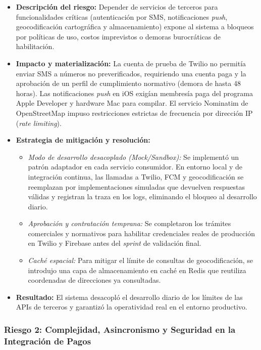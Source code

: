 \begin{itemize}
    \item \textbf{Descripción del riesgo:} Depender de servicios de terceros para funcionalidades críticas (autenticación por SMS, notificaciones \textit{push}, geocodificación cartográfica y almacenamiento) expone al sistema a bloqueos por políticas de uso, costos imprevistos o demoras burocráticas de habilitación.
    \item \textbf{Impacto y materialización:} La cuenta de prueba de Twilio no permitía enviar SMS a números no preverificados, requiriendo una cuenta paga y la aprobación de un perfil de cumplimiento normativo (demora de hasta 48 horas). Las notificaciones \textit{push} en iOS exigían membresía paga del programa Apple Developer y hardware Mac para compilar. El servicio Nominatim de OpenStreetMap impuso restricciones estrictas de frecuencia por dirección IP (\textit{rate limiting}).
    \item \textbf{Estrategia de mitigación y resolución:}
    \begin{itemize}
        \item \textit{Modo de desarrollo desacoplado (Mock/Sandbox):} Se implementó un patrón adaptador en cada servicio consumidor. En entorno local y de integración continua, las llamadas a Twilio, FCM y geocodificación se reemplazan por implementaciones simuladas que devuelven respuestas válidas y registran la traza en los logs, eliminando el bloqueo al desarrollo diario.
        \item \textit{Aprobación y contratación temprana:} Se completaron los trámites comerciales y normativos para habilitar credenciales reales de producción en Twilio y Firebase antes del \textit{sprint} de validación final.
        \item \textit{Caché espacial:} Para mitigar el límite de consultas de geocodificación, se introdujo una capa de almacenamiento en caché en Redis que reutiliza coordenadas de direcciones ya consultadas.
    \end{itemize}
    \item \textbf{Resultado:} El sistema desacopló el desarrollo diario de los límites de las APIs de terceros y garantizó la operatividad real en el entorno productivo.
\end{itemize}

\subsubsection{Riesgo 2: Complejidad, Asincronismo y Seguridad en la Integración de Pagos}

